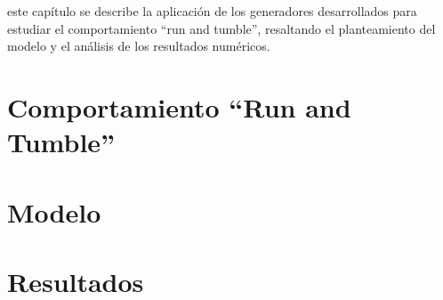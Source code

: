 \documentclass[../Main.tex]{subfiles}
\begin{document}
 este capítulo se describe la aplicación de los generadores desarrollados para estudiar el comportamiento ``run and tumble'', resaltando el planteamiento del modelo y el análisis de los resultados numéricos.

\section{Comportamiento ``Run and Tumble''}
\section{Modelo}
\section{Resultados}
 
\end{document}
